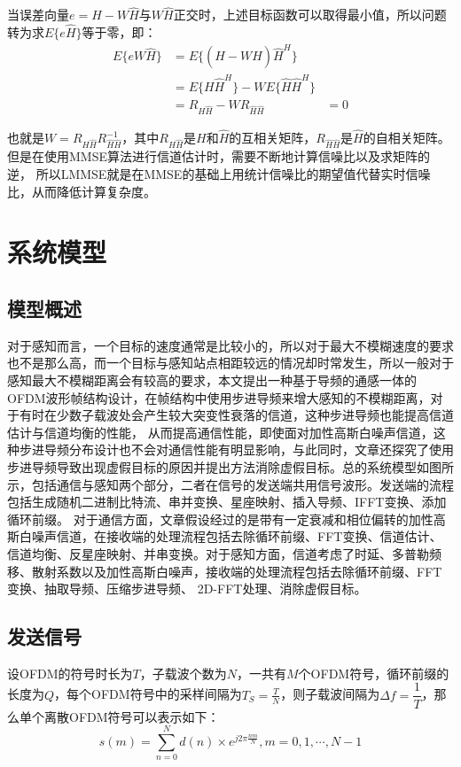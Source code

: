 \documentclass[12pt, a4paper, oneside]{ctexart}
\begin{document}
当误差向量$e=H-W\widehat{H}$与$W\widehat{H}$正交时，上述目标函数可以取得最小值，所以问题转为求$E\{e\widehat{H}\}$等于零，即：
$$
\begin{aligned}
    E\{eW\widehat{H}\} &=E\{(H-W\widehat{H})\widehat{H}^H\} \\
    &=E\{H\widehat{H}^H\}-WE\{\widehat{H}\widehat{H}^H\} \\
    &=R_{H\widehat{H}}-WR_{\widehat{H}\widehat{H}} &=0
\end{aligned}
$$

也就是$W=R_{H\widehat{H}}R_{\widehat{H}\widehat{H}}^{-1}$，其中$R_{H\widehat{H}}$是$H$和$\widehat{H}$的互相关矩阵，$R_{\widehat{H}\widehat{H}}$是$\widehat{H}$的自相关矩阵。但是在使用MMSE算法进行信道估计时，需要不断地计算信噪比以及求矩阵的逆，
所以LMMSE就是在MMSE的基础上用统计信噪比的期望值代替实时信噪比，从而降低计算复杂度。

\section{\heiti{} 系统模型}
\subsection*{\heiti{} 模型概述}
\songti 对于感知而言，一个目标的速度通常是比较小的，所以对于最大不模糊速度的要求也不是那么高，而一个目标与感知站点相距较远的情况却时常发生，所以一般对于感知最大不模糊距离会有较高的要求，本文提出一种基于导频的通感一体的OFDM波形帧结构设计，在帧结构中使用步进导频来增大感知的不模糊距离，对于有时在少数子载波处会产生较大突变性衰落的信道，这种步进导频也能提高信道估计与信道均衡的性能，
从而提高通信性能，即使面对加性高斯白噪声信道，这种步进导频分布设计也不会对通信性能有明显影响，与此同时，文章还探究了使用步进导频导致出现虚假目标的原因并提出方法消除虚假目标。总的系统模型如图所示，包括通信与感知两个部分，二者在信号的发送端共用信号波形。发送端的流程包括生成随机二进制比特流、串并变换、星座映射、插入导频、IFFT变换、添加循环前缀。
对于通信方面，文章假设经过的是带有一定衰减和相位偏转的加性高斯白噪声信道，在接收端的处理流程包括去除循环前缀、FFT变换、信道估计、信道均衡、反星座映射、并串变换。对于感知方面，信道考虑了时延、多普勒频移、散射系数以及加性高斯白噪声，接收端的处理流程包括去除循环前缀、FFT变换、抽取导频、压缩步进导频、
2D-FFT处理、消除虚假目标。
\subsection*{\heiti{} 发送信号}
\songti 设OFDM的符号时长为$T$，子载波个数为$N$，一共有$M$个OFDM符号，循环前缀的长度为$Q$，每个OFDM符号中的采样间隔为$T_S=\frac{T}{N}$，则子载波间隔为$\Delta f = \dfrac{1}{T} $，那么单个离散OFDM符号可以表示如下：
\[
    s(m) = \sum_{n=0}^{N} d(n)\times e^{j2\pi \frac{nm}{N}},m=0,1,\cdots,N-1
\]
\end{document}
